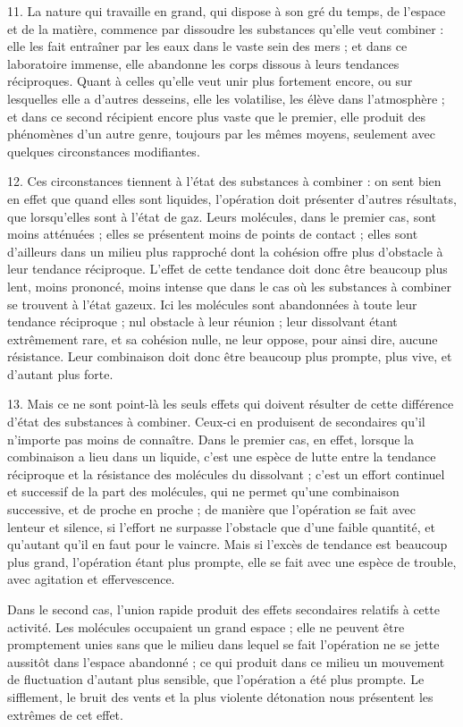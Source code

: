 \documentclass[a4paper, 11pt, oneside, polutonikogreek, french]{article}
\begin{document}
11. La nature qui travaille en grand, qui dispose à son gré du temps, de l'espace et de la matière, commence par dissoudre les substances qu'elle veut combiner : elle les fait entraîner par les eaux dans le vaste sein des mers ; et dans ce laboratoire immense, elle abandonne les corps dissous à leurs tendances réciproques. Quant à celles qu'elle veut unir plus fortement encore, ou sur lesquelles elle a d'autres desseins, elle les volatilise, les élève dans l'atmosphère ; et dans ce second récipient encore plus vaste que le premier, elle produit des phénomènes d'un autre genre, toujours par les mêmes moyens, seulement avec quelques circonstances modifiantes.

12. Ces circonstances tiennent à l'état des substances à combiner : on sent bien en effet que quand elles sont liquides, l'opération doit présenter d'autres résultats, que lorsqu'elles sont à l'état de gaz. Leurs molécules, dans le premier cas, sont moins atténuées ; elles se présentent moins de points de contact ; elles sont d'ailleurs dans un milieu plus rapproché dont la cohésion offre plus d'obstacle à leur tendance réciproque. L'effet de cette tendance doit donc être beaucoup plus lent, moins prononcé, moins intense que dans le cas où les substances à combiner se trouvent à l'état gazeux. Ici les molécules sont abandonnées à toute leur tendance réciproque ; nul obstacle à leur réunion ; leur dissolvant étant extrêmement rare, et sa cohésion nulle, ne leur oppose, pour ainsi dire, aucune résistance. Leur combinaison doit donc être beaucoup plus prompte, plus vive, et d'autant plus forte.

13. Mais ce ne sont point-là les seuls effets qui doivent résulter de cette différence d'état des substances à combiner. Ceux-ci en produisent de secondaires qu'il n'importe pas moins de connaître. Dans le premier cas, en effet, lorsque la combinaison a lieu dans un liquide, c'est une espèce de lutte entre la tendance réciproque et la résistance des molécules du dissolvant ; c'est un effort continuel et successif de la part des molécules, qui ne permet qu'une combinaison successive, et de proche en proche ; de manière que l'opération se fait avec lenteur et silence, si l'effort ne surpasse l'obstacle que d'une faible quantité, et qu'autant qu'il en faut pour le vaincre. Mais si l'excès de tendance est beaucoup plus grand, l'opération étant plus prompte, elle se fait avec une espèce de trouble, avec agitation et effervescence.

Dans le second cas, l'union rapide produit des effets secondaires relatifs à cette activité. Les molécules occupaient un grand espace ; elle ne peuvent être promptement unies sans que le milieu dans lequel se fait l'opération ne se jette aussitôt dans l'espace abandonné ; ce qui produit dans ce milieu un mouvement de fluctuation d'autant plus sensible, que l'opération a été plus prompte. Le sifflement, le bruit des vents et la plus violente détonation nous présentent les extrêmes de cet effet.
\end{document}
